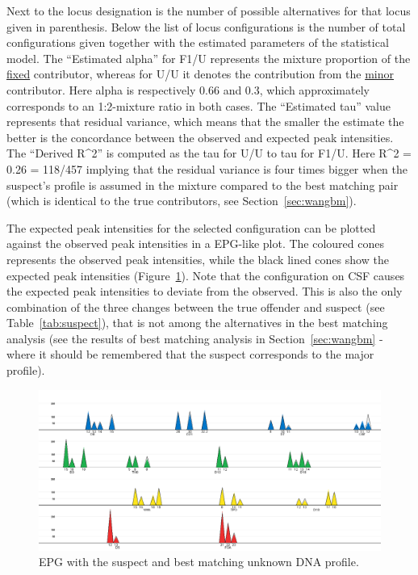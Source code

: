 \documentclass[a4paper,11pt]{article}
\begin{document}
Next to the locus designation is the number of possible alternatives
for that locus given in parenthesis. Below the list of locus
configurations is the number of total configurations given together
with the estimated parameters of the statistical model. The ``Estimated
alpha'' for F1/U represents the mixture proportion of the
\underline{fixed} contributor, whereas for U/U it denotes the
contribution from the \underline{minor} contributor. Here alpha is
respectively 0.66 and 0.3, which approximately corresponds to an
1:2-mixture ratio in both cases. The ``Estimated tau'' value represents
that residual variance, which means that the smaller the estimate the
better is the concordance between the observed and expected peak
intensities. The ``Derived R\^{}2'' is computed as the tau for U/U to
tau for F1/U. Here R\^{}2 = 0.26 = 118/457 implying that the
residual variance is four times bigger when the suspect's profile is
assumed in the mixture compared to the best matching pair (which is
identical to the true contributors, see Section~\ref{sec:wangbm}).

The expected peak intensities for the selected configuration can be
plotted against the observed peak intensities in a EPG-like plot. The
coloured cones represents the observed peak intensities, while the
black lined cones show the expected peak intensities
(Figure~\ref{fig:plotsuspect}). Note that the configuration on CSF
causes the expected peak intensities to deviate from the
observed. This is also the only combination of the three changes
between the true offender and suspect (see Table~\ref{tab:suspect}),
that is not among the alternatives in the best matching analysis (see
the results of best matching analysis in Section~\ref{sec:wangbm} -
where it should be remembered that the suspect corresponds to the
major profile).

\begin{figure}[!h]
  \centering
  \includegraphics[width=15cm]{plot_suspect}
  \caption{\label{fig:plotsuspect}EPG with the suspect and best
    matching unknown DNA profile.}
\end{figure}
\end{document}
